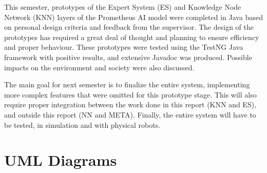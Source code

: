 \documentclass[titlepage,11pt]{article}
\newcommand{\code}[1]{\texttt{#1}}
\begin{document}
This semester, prototypes of the Expert System (ES) and Knowledge Node Network (KNN) layers of the Prometheus AI model were completed in Java based on personal design criteria and feedback from the supervisor. The design of the prototypes has required a great deal of thought and planning to ensure efficiency and proper behaviour. These prototypes were tested using the TestNG Java framework with positive results, and extensive Javadoc was produced. Possible impacts on the environment and society were also discussed.

The main goal for next semester is to finalize the entire system, implementing more complex features that were omitted for this prototype stage. This will also require proper integration between the work done in this report (KNN and ES), and outside this report (NN and META). Finally, the entire system will have to be tested, in simulation and with physical robots.

\clearpage
\onecolumn
\appendix

\renewcommand\thefigure{\thesection.\arabic{figure}}
\setcounter{figure}{0}    

\section{UML Diagrams}
\label{sec:uml}




\clearpage

{}

\end{document}
